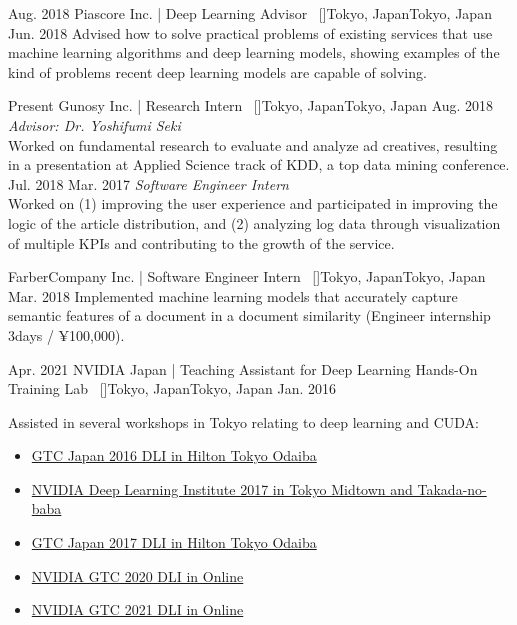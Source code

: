 \begin{experiences}
\emptySeparator
\researchexperience
    {Aug. 2018}   {Piascore Inc. | Deep Learning Advisor{\normalfont  ~ [\href{http://piascore.com/en/}{\small{\websiteSymbol}}]}}{Tokyo, Japan}{Tokyo, Japan}
    {Jun. 2018} {
        Advised how to solve practical problems of existing services that use machine learning algorithms and deep learning models, showing examples of the kind of problems recent deep learning models are capable of solving.
    }

\emptySeparator
\researchexperience
    {Present}   {Gunosy Inc. | Research Intern{\normalfont  ~ [\href{https://gunosy.co.jp/en/}{\small{\websiteSymbol}}]}}{Tokyo, Japan}{Tokyo, Japan}
    {Aug. 2018} {\textit{Advisor: Dr. Yoshifumi Seki}\\
    Worked on fundamental research to evaluate and analyze ad creatives, resulting in a presentation at Applied Science track of KDD, a top data mining conference.
    \vskip 0.1cm
    }
\researchexperience
    {Jul. 2018}   {}{}{}
    {Mar. 2017} {\textit{Software Engineer Intern}\\
        Worked on (1) improving the user experience and participated in improving the logic of the article distribution, and (2) analyzing log data through visualization of multiple KPIs and contributing to the growth of the service.
    }

\emptySeparator
\researchexperience
    {}   {FarberCompany Inc. | Software Engineer Intern{\normalfont  ~ [\href{https://www.fabercompany.co.jp/}{\small{\websiteSymbol}}]}}{Tokyo, Japan}{Tokyo, Japan}
    {Mar. 2018} {
        Implemented machine learning models that accurately capture semantic features of a document in a document similarity (Engineer internship 3days / ¥100,000).
    }

\emptySeparator
\researchexperience
    {Apr. 2021}   {NVIDIA Japan | Teaching Assistant for Deep Learning Hands-On Training Lab{\normalfont  ~ [\href{https://www.nvidia.com/ja-jp/}{\small{\websiteSymbol}}]}}{Tokyo, Japan}{Tokyo, Japan}
    {Jan. 2016} {
        Assisted in several workshops in Tokyo relating to deep learning and CUDA:
        \begin{itemize}
            \item \href{https://nvidia.connpass.com/event/39743/}{GTC Japan 2016 DLI in Hilton Tokyo Odaiba}
            \item \href{https://nvidia.connpass.com/event/54780/}{NVIDIA Deep Learning Institute 2017 in Tokyo Midtown and Takada-no-baba}
            \item \href{https://nvidia.connpass.com/event/68912/}{GTC Japan 2017 DLI in Hilton Tokyo Odaiba}
            \item \href{https://nvidia.connpass.com/event/189637/}{NVIDIA GTC 2020 DLI in Online}
            \item \href{https://nvidia.connpass.com/event/208506/}{NVIDIA GTC 2021 DLI in Online}
        \end{itemize}
    }


\end{experiences}
